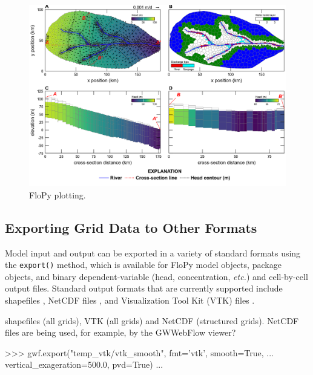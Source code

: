 \documentclass[11pt, oneside]{article}   	%
\begin{document}

\begin{figure}[ht!]
	\begin{center}
		\includegraphics{figures/grids_flopy_plots.png}
	\end{center}
	\caption{FloPy plotting.}
	\label{fig:flopyplots}
\end{figure}


\subsection{Exporting Grid Data to Other Formats}

Model input and output can be exported in a variety of standard formats using the \texttt{export()} method, which is available for FloPy model objects, package objects, and binary dependent-variable (head, concentration, \textit{etc.}) and cell-by-cell output files. Standard output formats that are currently supported include shapefiles \citep{environmental1998esri}, NetCDF files \citep{rew2006netcdf, rew1990netcdf}, and Visualization Tool Kit (VTK) files \citep{schroeder:2006:VTK}.

shapefiles (all grids), VTK (all grids) and NetCDF (structured grids).  NetCDF files are being used, for example, by the GWWebFlow viewer?  

\begin{python}
>>> gwf.export("temp_vtk/vtk_smooth", fmt='vtk', smooth=True,
... vertical_exageration=500.0, pvd=True)
...
\end{python}

\end{document}
